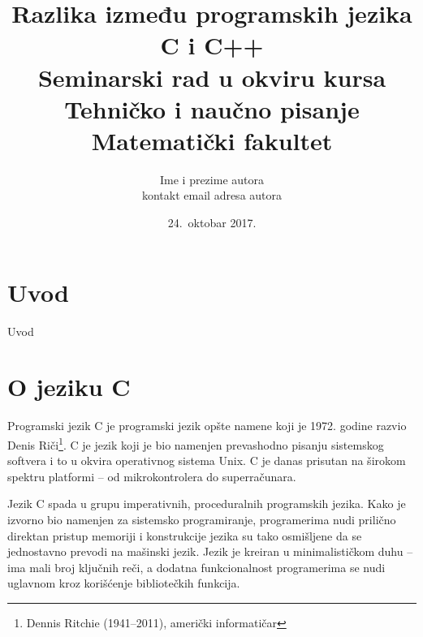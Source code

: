 \documentclass[a4paper]{article}
\begin{document}
\title{Razlika između programskih jezika C i C++\\ \small{Seminarski rad u okviru kursa\\Tehničko i naučno pisanje\\ Matematički fakultet}}

\author{Ime i prezime autora\\ kontakt email adresa autora}
\date{24.~oktobar 2017.}
\maketitle


\tableofcontents

\newpage

\section{Uvod}
\label{sec:uvod}
Uvod

\section{O jeziku C}
Programski jezik C je programski jezik opšte namene koji je 1972. godine razvio Denis Riči\footnote{Dennis Ritchie (1941--2011), američki informatičar}. C je jezik koji je bio namenjen prevashodno pisanju sistemskog softvera i to u okvira operativnog sistema Unix. C je danas prisutan na širokom spektru platformi -- od mikrokontrolera do superračunara.

Jezik C spada u grupu imperativnih, proceduralnih programskih jezika. Kako je izvorno bio namenjen za sistemsko programiranje, programerima nudi prilično direktan pristup memoriji i konstrukcije jezika su tako osmišljene da se jednostavno prevodi na mašinski jezik. Jezik je kreiran u minimalističkom duhu -- ima mali broj ključnih reči, a dodatna funkcionalnost programerima se nudi uglavnom kroz korišćenje bibliotečkih funkcija.
\end{document}
